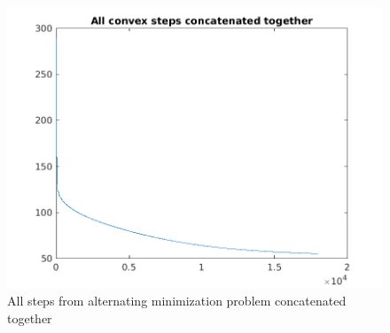 \documentclass{article}
\newcommand{\0}{\mathrm{0}}
\newcommand{\1}{\mathrm{1}}
\begin{document}
\begin{figure}
  \includegraphics{fixed-step-all.png}
  \caption{All steps from alternating minimization problem concatenated together}
\end{figure}
\end{document}
